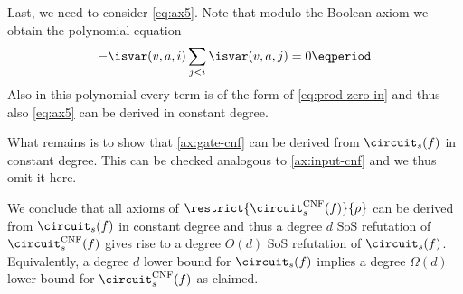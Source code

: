 Last, we need to consider \cref{eq:ax5}. Note that modulo the Boolean
axiom we obtain the polynomial equation
\begin{align}
  - \isvar(v,a,i)\sum_{j < i}\isvar(v,a,j) = 0 \eqperiod
\end{align}
Also in this polynomial every term is of the form of
\cref{eq:prod-zero-in} and thus also \cref{eq:ax5} can be derived in
constant degree.

What remains is to show that \cref{ax:gate-cnf} can be derived from
$\circuit_s(f)$ in constant degree. This can be checked analogous to
\cref{ax:input-cnf} and we thus omit it here.

We conclude that all axioms of $\restrict{\circuit^{\mathrm{CNF}}_s(f)}{\rho}$ can
be derived from $\circuit_s(f)$ in constant degree and thus a degree
$d$ SoS refutation of $\circuit_s^{\mathrm{CNF}}(f)$ gives rise to a degree
$O(d)$ SoS refutation of $\circuit_s(f)$. Equivalently, a degree $d$
lower bound for $\circuit_s(f)$ implies a degree $\Omega(d)$ lower
bound for $\circuit_s^{\mathrm{CNF}}(f)$ as claimed.
